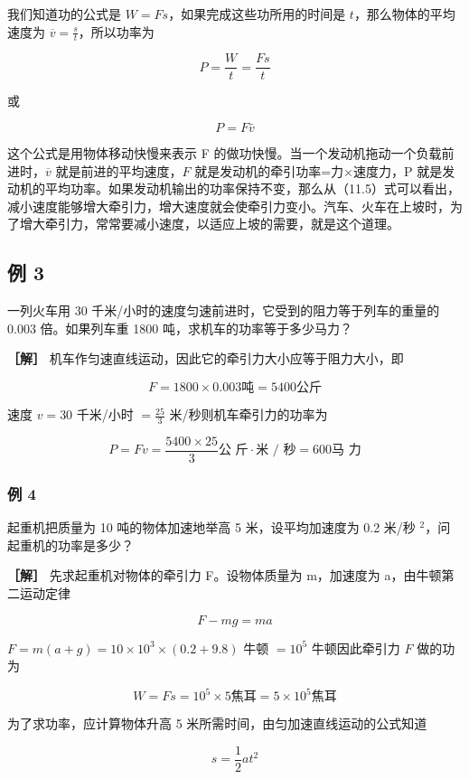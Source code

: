 我们知道功的公式是 \(W = Fs\)，如果完成这些功所用的时间是
\(t\)，那么物体的平均速度为 \(\overline{v} = \frac{s}{t}\)，所以功率为

\[
P = \frac {W}{t} = \frac {F s}{t}
\]

或

\[
P = F \bar {v} \tag {71.5}
\]

这个公式是用物体移动快慢来表示 F
的做功快慢。当一个发动机拖动一个负载前进时，\(\overline{v}\)
就是前进的平均速度，\(F\) 就是发动机的牵引功率=力×速度力，P
就是发动机的平均功率。如果发动机输出的功率保持不变，那么从（11.5）式可以看出，减小速度能够增大牵引力，增大速度就会使牵引力变小。汽车、火车在上坡时，为了增大牵引力，常常要减小速度，以适应上坡的需要，就是这个道理。

\subsection{例 3}\label{ux4f8b-3-9}

一列火车用 30 千米/小时的速度匀速前进时，它受到的阻力等于列车的重量的
0.003 倍。如果列车重 1800 吨，求机车的功率等于多少马力？

\textbf{［解］} 机车作匀速直线运动，因此它的牵引力大小应等于阻力大小，即

\[
F = 1800 \times 0.003 \text{吨} = 5400 \text{公斤}
\]

速度 \(v = 30\) 千米/小时 \(= \frac{25}{3}\) 米/秒则机车牵引力的功率为

\[
P = F v = \frac {5400 \times 25}{3} \text{公 斤} \cdot \text{米 / 秒} = 600 \text{马 力}
\]

\subsubsection{例 4}\label{ux4f8b-4-9}

起重机把质量为 10 吨的物体加速地举高 5 米，设平均加速度为 0.2 米/秒
\(^{2}\)，问起重机的功率是多少？

\textbf{［解］} 先求起重机对物体的牵引力 F。设物体质量为 m，加速度为
a，由牛顿第二运动定律

\[
F - m g = m a
\]

\(F = m(a + g) = 10 \times 10^{3} \times (0.2 + 9.8)\) 牛顿 \(= 10^{5}\)
牛顿因此牵引力 \(F\) 做的功为

\[
W = F s = 10 ^ {5} \times 5 \text{焦耳} = 5 \times 10 ^ {5} \text{焦耳}
\]

为了求功率，应计算物体升高 5 米所需时间，由匀加速直线运动的公式知道

\[
s = \frac {1}{2} a t ^ {2}
\]

